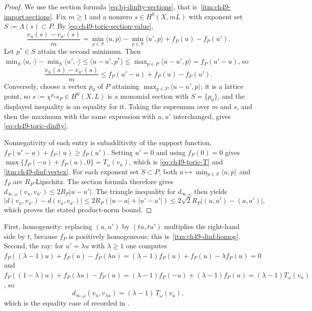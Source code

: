 \begin{proof}
We use the section formula \eqref{eq:bj-dinfty-sections}, that is
\,\cref{itm:ch49-import:sections}.  Fix $m\ge1$
and a nonzero $s\in H^0(X,mL)$ with exponent set
$S:=\Lambda(s)\subset P$.  By \eqref{eq:ch49-toric-section-value},
\[
 \frac{v_u(s)-v_{u'}(s)}{m}
 =\min_{p\in S}\langle u,p\rangle-\min_{p\in S}\langle u',p\rangle
  +f_P(u)-f_P(u') .
\]
Let $p^*\in S$ attain the second minimum.  Then
$\min_S\langle u,\cdot\rangle-\min_S\langle u',\cdot\rangle
\le\langle u-u',p^*\rangle\le\max_{p\in P}\langle u-u',p\rangle
=f_P(u'-u)$, so
\[
 \frac{v_u(s)-v_{u'}(s)}{m}\le f_P(u'-u)+f_P(u)-f_P(u') .
\]
Conversely, choose a vertex $p_0$ of $P$ attaining
$\max_{p\in P}\langle u-u',p\rangle$; it is a lattice point, so
$s:=\chi^{p_0}s_P\in H^0(X,L)$ is a monomial section with
$S=\{p_0\}$, and the displayed inequality is an equality for it.  Taking
the supremum over $m$ and $s$, and then the maximum with the same
expression with $u,u'$ interchanged, gives
\eqref{eq:ch49-toric-dinfty}.

Nonnegativity of each entry is subadditivity of the support function,
$f_P(u'-u)+f_P(u)\ge f_P(u')$.  Setting $u'=0$ and using
$f_P(0)=0$ gives $\max\{f_P(-u)+f_P(u),0\}=T_\omega(v_u)$, which is
\eqref{eq:ch49-toric-T} and
\,\cref{itm:ch49-dinf:vertex}.  For each exponent set $S\subset P$, both
$u\mapsto\min_{p\in S}\langle u,p\rangle$ and $f_P$ are
$R_P$-Lipschitz.  The section formula therefore gives
$d_{\infty,\omega}(v_u,v_{u'})\le2R_P|u-u'|$.
The triangle inequality for $d_{\infty,\omega}$ then yields
\[
 |d(v_u,v_{u'})-d(v_a,v_{a'})|
 \le2R_P(|u-a|+|u'-a'|)
 \le2\sqrt2 R_P|(u,u')-(a,a')|,
\]
which proves the stated product-norm bound.
\end{proof}

\begin{remark}
\label{rem:ch49-toric-dinfty-checks}
First, homogeneity: replacing $(u,u')$ by $(tu,tu')$ multiplies the
right-hand side by $t$, because $f_P$ is positively homogeneous; this
is \,\cref{itm:ch49-dinf:homog}.  Second, the
ray: for $u'=\lambda u$ with $\lambda\ge1$ one computes
$f_P((\lambda-1)u)+f_P(u)-f_P(\lambda u)=(\lambda-1)f_P(u)+f_P(u)
-\lambda f_P(u)=0$ and
$f_P((1-\lambda)u)+f_P(\lambda u)-f_P(u)
=(\lambda-1)f_P(-u)+(\lambda-1)f_P(u)=(\lambda-1)T_\omega(v_u)$, so
\[
 d_{\infty,\omega}(v_u,v_{\lambda u})=(\lambda-1)\,T_\omega(v_u),
\]
which is the equality case of
 recorded in
.
\end{remark}

